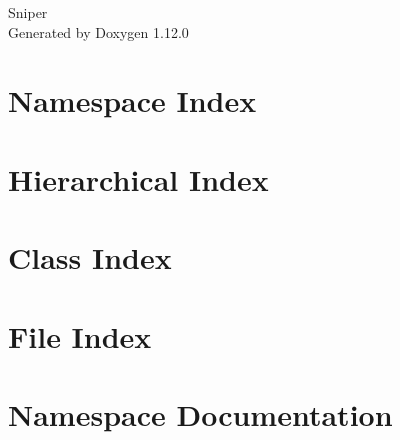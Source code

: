 \documentclass[twoside]{book}
\newcommand{\+}{\discretionary{\mbox{\scriptsize$\hookleftarrow$}}{}{}}
\newcommand{\clearemptydoublepage}{%
    \newpage{\pagestyle{empty}\cleardoublepage}%
  }
\begin{document}
  \raggedbottom
  \begin{titlepage}
  \vspace*{7cm}
  \begin{center}%
  {\Large Sniper}\\
  \vspace*{1cm}
  {\large Generated by Doxygen 1.12.0}\\
  \end{center}
  \end{titlepage}
  \clearemptydoublepage
  \tableofcontents
  \clearemptydoublepage

\chapter{Namespace Index}

\chapter{Hierarchical Index}

\chapter{Class Index}

\chapter{File Index}

\chapter{Namespace Documentation}











\end{document}
